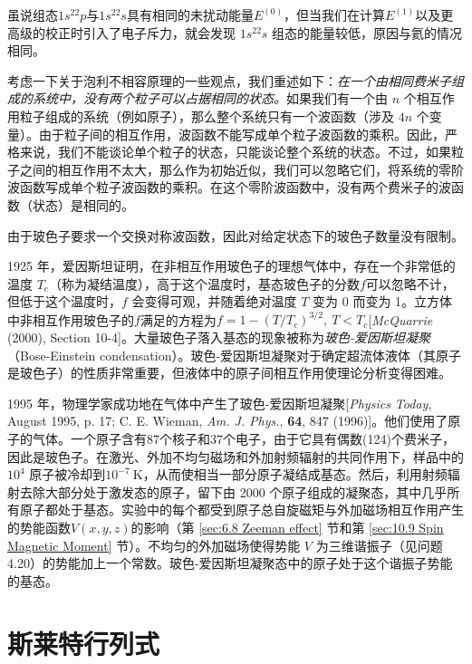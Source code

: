     虽说组态$1s^22p$与$1s^22s$具有相同的未扰动能量$E^{\left(0\right)}$，但当我们在计算$E^{\left(1\right)}$以及更高级的校正时引入了电子斥力，就会发现 $1s^22s$ 组态的能量较低，原因与氦的情况相同。

    考虑一下关于泡利不相容原理的一些观点，我们重述如下：\textit{在一个由相同费米子组成的系统中，没有两个粒子可以占据相同的状态。}如果我们有一个由 $n$ 个相互作用粒子组成的系统（例如原子），那么整个系统只有一个波函数（涉及 $4n$ 个变量）。由于粒子间的相互作用，波函数不能写成单个粒子波函数的乘积。因此，严格来说，我们不能谈论单个粒子的状态，只能谈论整个系统的状态。不过，如果粒子之间的相互作用不太大，那么作为初始近似，我们可以忽略它们，将系统的零阶波函数写成单个粒子波函数的乘积。在这个零阶波函数中，没有两个费米子的波函数（状态）是相同的。

    由于玻色子要求一个交换对称波函数，因此对给定状态下的玻色子数量没有限制。

    1925 年，爱因斯坦证明，在非相互作用玻色子的理想气体中，存在一个非常低的温度 $T_c$（称为凝结温度），高于这个温度时，基态玻色子的分数$f$可以忽略不计，但低于这个温度时，$f$ 会变得可观，并随着绝对温度 $T$ 变为 0 而变为 1。立方体中非相互作用玻色子的$f$满足的方程为$f = 1 - \left(T/T_c\right)^{3/2}, \: T < T_c$[\textit{McQuarrie} (2000), Section 10-4]。大量玻色子落入基态的现象被称为\textit{玻色-爱因斯坦凝聚}（Bose-Einstein condensation）。玻色-爱因斯坦凝聚对于确定超流体液体（其原子是玻色子）的性质非常重要，但液体中的原子间相互作用使理论分析变得困难。

    1995 年，物理学家成功地在气体中产生了玻色-爱因斯坦凝聚[\textit{Physics Today}, August 1995, p. 17; C. E. Wieman, \textit{Am. J. Phys.}, \textbf{64}, 847 (1996)]。他们使用了原子的气体。一个原子含有87个核子和37个电子，由于它具有偶数(124)个费米子，因此是玻色子。在激光、外加不均匀磁场和外加射频辐射的共同作用下，样品中的$10^4$ 原子被冷却到$10^{-7} \: \mathrm{K}$，从而使相当一部分原子凝结成基态。然后，利用射频辐射去除大部分处于激发态的原子，留下由 2000 个原子组成的凝聚态，其中几乎所有原子都处于基态。实验中的每个都受到原子总自旋磁矩与外加磁场相互作用产生的势能函数$V\left(x,y,z\right)$的影响（第 \ref{sec:6.8 Zeeman effect} 节和第 \ref{sec:10.9 Spin Magnetic Moment} 节）。不均匀的外加磁场使得势能 $V$ 为三维谐振子（见问题4.20）的势能加上一个常数。玻色-爱因斯坦凝聚态中的原子处于这个谐振子势能的基态。

\section{斯莱特行列式}
\label{sec:10.6 Slater Determinants}

















